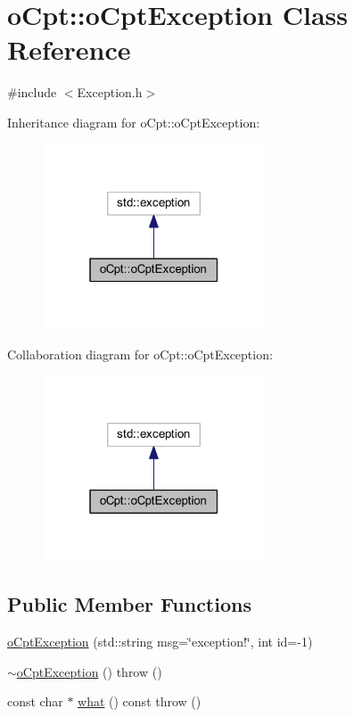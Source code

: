 \hypertarget{classo_cpt_1_1o_cpt_exception}{}\section{o\+Cpt\+:\+:o\+Cpt\+Exception Class Reference}
\label{classo_cpt_1_1o_cpt_exception}


{\ttfamily \#include $<$Exception.\+h$>$}



Inheritance diagram for o\+Cpt\+:\+:o\+Cpt\+Exception\+:\nopagebreak
\begin{figure}[H]
\begin{center}
\leavevmode
\includegraphics[width=187pt]{classo_cpt_1_1o_cpt_exception__inherit__graph}
\end{center}
\end{figure}


Collaboration diagram for o\+Cpt\+:\+:o\+Cpt\+Exception\+:\nopagebreak
\begin{figure}[H]
\begin{center}
\leavevmode
\includegraphics[width=187pt]{classo_cpt_1_1o_cpt_exception__coll__graph}
\end{center}
\end{figure}
\subsection*{Public Member Functions}
\begin{DoxyCompactItemize}
\item 
\hyperlink{classo_cpt_1_1o_cpt_exception_a208458b2a2bf67fc8ca289b469e59cdf}{o\+Cpt\+Exception} (std\+::string msg=\char`\"{}exception!\char`\"{}, int id=-\/1)
\item 
\hyperlink{classo_cpt_1_1o_cpt_exception_a4083ed2718d9bdf097874c98aab69804}{$\sim$o\+Cpt\+Exception} ()  throw ()
\item 
const char $\ast$ \hyperlink{classo_cpt_1_1o_cpt_exception_ac2588bcada015842a63ed4b41866228e}{what} () const  throw ()
\end{DoxyCompactItemize}
